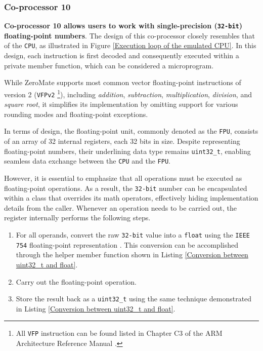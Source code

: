 \documentclass[english, ing, kiv, he, iso690numb, pdf]{fasthesis}
\begin{document}
	\subsubsection{Co-processor 10} \label{section-Co-processor-10}
	
	\textbf{Co-processor 10 allows users to work with single-precision (\texttt{32-bit}) floating-point numbers}. The design of this co-processor closely resembles that of the \texttt{CPU}, as illustrated in Figure \ref{Execution loop of the emulated CPU}. In this design, each instruction is first decoded and consequently executed within a private member function, which can be considered a microprogram.
	
	\begin{important}
		While ZeroMate supports most common vector floating-point instructions of version 2 (\texttt{VFPv2} \footnote{All \texttt{VFP} instruction can be found listed in Chapter C3 of the ARM Architecture Reference Manual \cite{ARM_reference_manual}.}), including \textit{addition}, \textit{subtraction}, \textit{multiplication}, \textit{division}, and \textit{square root}, it simplifies its implementation by omitting support for various rounding modes and floating-point exceptions. 
	\end{important}
	
	In terms of design, the floating-point unit, commonly denoted as the \texttt{FPU}, consists of an array of 32 internal registers, each 32 bits in size. Despite representing floating-point numbers, their underlining data type remains \texttt{uint32\_t}, enabling seamless data exchange between the \texttt{CPU} and the \texttt{FPU}.
	
	However, it is essential to emphasize that all operations must be executed as floating-point operations. As a result, the \texttt{32-bit} number can be encapsulated within a class that overrides its math operators, effectively hiding implementation details from the caller. Whenever an operation needs to be carried out, the register internally performs the following steps.
	
	\begin{enumerate}
		\item For all operands, convert the raw \texttt{32-bit} value into a \texttt{float} using the \texttt{IEEE 754} floating-point representation \cite{IEEE754}. This conversion can be accomplished through the helper member function shown in Listing \ref{Conversion between uint32_t and float}.
		\item Carry out the floating-point operation.
		\item Store the result back as a \texttt{uint32\_t} using the same technique demonstrated in Listing \ref{Conversion between uint32_t and float}.
	\end{enumerate}
	
\end{document}
